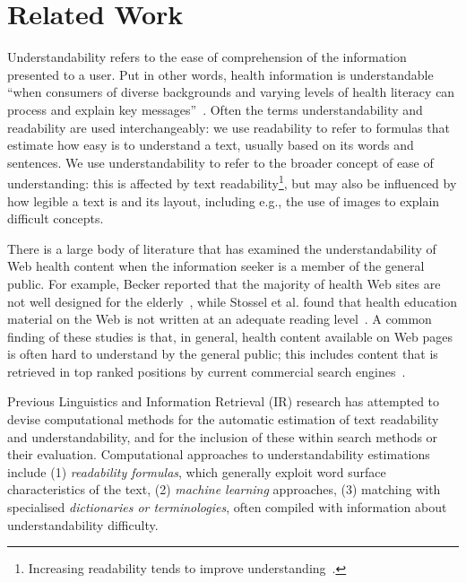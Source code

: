 
\section{Related Work}
\label{sec:related}
Understandability refers to the ease of comprehension of the information presented to a user. Put in other words, health information is understandable ``when consumers of diverse backgrounds and varying levels of health literacy can process and explain key messages''~\cite{shoemaker2014development}. Often the terms understandability and readability are used interchangeably: we use readability to refer to formulas that estimate how easy is to understand a text, usually based on its words and sentences. We use understandability to refer to the broader concept of ease of understanding: this is affected by text readability\footnote{Increasing readability tends to improve understanding~\cite{ley1996use}.}, but may also be influenced by how legible a text is and its layout, including e.g., the use of images to explain difficult concepts.

There is a large body of literature that has examined the understandability of Web health content when the information seeker is a member of the general public. For example, Becker reported that the majority of health Web sites are not well designed for the elderly~\cite{becker04}, while Stossel et al. found that  health education material on the Web is not written at an adequate reading level~\cite{stossel12}.
A common finding of these studies is that, in general, health content available on Web pages is often hard to understand by the general public; this includes content that is retrieved in top ranked positions by current commercial search engines~\cite{graber99,fitzsimmons10,wiener13,patel13,atcherson14,meillier17}.

Previous Linguistics and Information Retrieval (IR) research has attempted to devise computational methods for the automatic estimation of text readability and understandability, and for the inclusion of these within search methods or their evaluation. Computational approaches to understandability estimations include (1) \textit{readability formulas}, which generally exploit word surface characteristics of the text, (2) \textit{machine learning} approaches, (3) matching with specialised \textit{dictionaries or terminologies}, often compiled with information about understandability difficulty.

